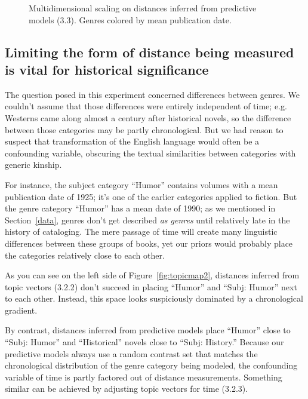 \documentclass[11pt]{article}
\begin{document}
\begin{figure}[t!]
\begin{minipage}{.47\textwidth}
  \caption{Multidimensional scaling on distances inferred from predictive models (3.3). Genres colored by mean publication date.}
  \label{fig:predictivemap3}
\end{minipage}
\end{figure}

\subsection{Limiting the form of distance being measured is vital for historical significance}

The question posed in this experiment concerned differences between genres. We couldn't assume that those differences were entirely independent of time; e.g. Westerns came along almost a century after historical novels, so the difference between those categories may be partly chronological. But we had reason to suspect that transformation of the English language would often be a confounding variable, obscuring the textual similarities between categories with generic kinship. 

For instance, the subject category ``Humor'' contains volumes with a mean publication date of 1925; it's one of the earlier categories applied to fiction. But the genre category ``Humor'' has a mean date of 1990; as we mentioned in Section~\ref{data}, genres don't get described \textit{as genres} until relatively late in the history of cataloging. The mere passage of time will create many linguistic differences between these groups of books, yet our priors would probably place the categories relatively close to each other.

As you can see on the left side of Figure~\ref{fig:topicmap2}, distances inferred from topic vectors (3.2.2) don't succeed in placing ``Humor'' and ``Subj: Humor'' next to each other. Instead, this space looks suspiciously dominated by a chronological gradient.

By contrast, distances inferred from predictive models place ``Humor'' close to ``Subj: Humor'' and ``Historical'' novels close to ``Subj: History.'' Because our predictive models always use a random contrast set that matches the chronological distribution of the genre category being modeled, the confounding variable of time is partly factored out of distance measurements. Something similar can be achieved by adjusting topic vectors for time (3.2.3).
\end{document}
